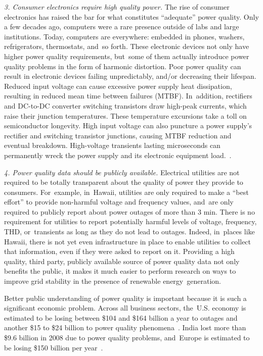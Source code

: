 \documentclass[energies,article,accept,moreauthors,pdftex]{Definitions/mdpi}
\begin{document}
{\em 3. Consumer electronics require high quality power.} The rise of consumer electronics has raised the bar for what constitutes ``adequate'' power quality. Only a few decades ago, computers were a rare presence outside of labs and large institutions. Today, computers are everywhere: embedded in phones, washers, refrigerators, thermostats, and~so forth. These electronic devices not only have higher power quality requirements, but~some of them actually introduce power quality problems in the form of harmonic distortion. Poor power quality can result in electronic devices failing unpredictably, and/or decreasing their lifespan. Reduced input voltage can cause excessive power supply heat dissipation, resulting in reduced mean time between failures (MTBF). In~addition, rectifiers and DC-to-DC converter switching transistors draw high-peak currents, which raise their junction temperatures. These temperature excursions take a toll on semiconductor longevity. High input voltage can also puncture a power supply's rectifier and switching transistor junctions, causing MTBF reduction and eventual breakdown. High-voltage transients lasting microseconds can permanently wreck the power supply and its electronic equipment load.~\cite{dedad_when_2008}.

{\em 4. Power quality data should be publicly available.} Electrical utilities are not required to be totally transparent about the quality of power they provide to consumers. For~example, in~Hawaii, utilities are only required to make a ``best effort'' to provide non-harmful voltage and frequency values, and~are only required to publicly report about power outages of more than 3 min. There is no requirement for utilities to report potentially harmful levels of voltage, frequency, THD, or~transients as long as they do not lead to outages. Indeed, in~places like Hawaii, there is not yet even infrastructure in place to enable utilities to collect that information, even if they were asked to report on it. Providing a high quality, third party, publicly available source of power quality data not only benefits the public, it makes it much easier to perform research on ways to improve grid stability in the presence of renewable energy~generation.

Better public understanding of power quality is important because it is such a significant economic problem. Across all business sectors, the~U.S. economy is estimated to be losing between \$104 and \$164 billion a year to outages and another \$15 to \$24 billion to power quality phenomena~\cite{elphick_summary_2015}. India lost more than \$9.6 billion in 2008 due to power quality problems, and~Europe is estimated to be losing \$150 billion per year~\cite{laskar_power_2012}.
\end{document}
